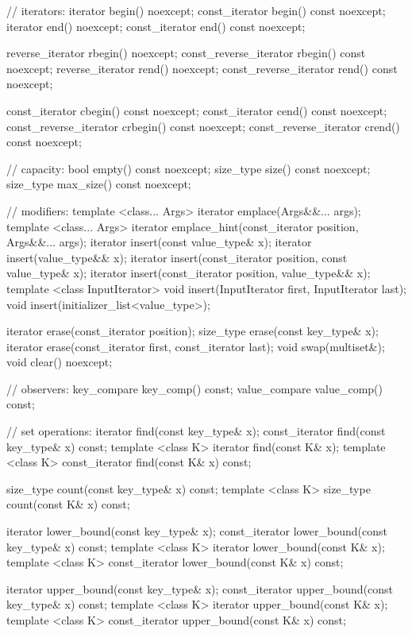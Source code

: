 \begin{codeblock}
{{    // iterators:
    iterator               begin() noexcept;
    const_iterator         begin() const noexcept;
    iterator               end() noexcept;
    const_iterator         end() const noexcept;

    reverse_iterator       rbegin() noexcept;
    const_reverse_iterator rbegin() const noexcept;
    reverse_iterator       rend() noexcept;
    const_reverse_iterator rend() const noexcept;

    const_iterator         cbegin() const noexcept;
    const_iterator         cend() const noexcept;
    const_reverse_iterator crbegin() const noexcept;
    const_reverse_iterator crend() const noexcept;

    // capacity:
    bool          empty() const noexcept;
    size_type     size() const noexcept;
    size_type     max_size() const noexcept;

    // modifiers:
    template <class... Args> iterator emplace(Args&&... args);
    template <class... Args> iterator emplace_hint(const_iterator position, Args&&... args);
    iterator insert(const value_type& x);
    iterator insert(value_type&& x);
    iterator insert(const_iterator position, const value_type& x);
    iterator insert(const_iterator position, value_type&& x);
    template <class InputIterator>
      void insert(InputIterator first, InputIterator last);
    void insert(initializer_list<value_type>);

    iterator  erase(const_iterator position);
    size_type erase(const key_type& x);
    iterator  erase(const_iterator first, const_iterator last);
    void swap(multiset&);
    void clear() noexcept;

    // observers:
    key_compare   key_comp() const;
    value_compare value_comp() const;

    // set operations:
    iterator        find(const key_type& x);
    const_iterator  find(const key_type& x) const;
    template <class K> iterator       find(const K& x);
    template <class K> const_iterator find(const K& x) const;

    size_type count(const key_type& x) const;
    template <class K> size_type count(const K& x) const;

    iterator        lower_bound(const key_type& x);
    const_iterator  lower_bound(const key_type& x) const;
    template <class K> iterator       lower_bound(const K& x);
    template <class K> const_iterator lower_bound(const K& x) const;

    iterator        upper_bound(const key_type& x);
    const_iterator  upper_bound(const key_type& x) const;
    template <class K> iterator       upper_bound(const K& x);
    template <class K> const_iterator upper_bound(const K& x) const;

}}
\end{codeblock}
